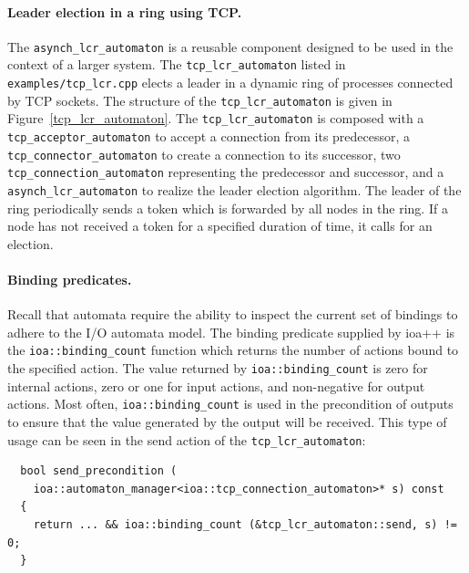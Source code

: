 \paragraph{Leader election in a ring using TCP.}
The \verb+asynch_lcr_automaton+ is a reusable component designed to be used in the context of a larger system.
The \verb+tcp_lcr_automaton+ listed in \verb+examples/tcp_lcr.cpp+ elects a leader in a dynamic ring of processes connected by TCP sockets.
The structure of the \verb+tcp_lcr_automaton+ is given in Figure~\ref{tcp_lcr_automaton}.
The \verb+tcp_lcr_automaton+ is composed with a \verb+tcp_acceptor_automaton+ to accept a connection from its predecessor, a \verb+tcp_connector_automaton+ to create a connection to its successor, two \verb+tcp_connection_automaton+ representing the predecessor and successor, and a \verb+asynch_lcr_automaton+ to realize the leader election algorithm.
The leader of the ring periodically sends a token which is forwarded by all nodes in the ring.
If a node has not received a token for a specified duration of time, it calls for an election.

\paragraph{Binding predicates.}
Recall that automata require the ability to inspect the current set of bindings to adhere to the I/O automata model.
The binding predicate supplied by ioa++ is the \verb+ioa::binding_count+ function which returns the number of actions bound to the specified action.
The value returned by \verb+ioa::binding_count+ is zero for internal actions, zero or one for input actions, and non-negative for output actions.
Most often, \verb+ioa::binding_count+ is used in the precondition of outputs to ensure that the value generated by the output will be received.
This type of usage can be seen in the send action of the \verb+tcp_lcr_automaton+:
\begin{lstlisting}
  bool send_precondition (
    ioa::automaton_manager<ioa::tcp_connection_automaton>* s) const
  {
    return ... && ioa::binding_count (&tcp_lcr_automaton::send, s) != 0;
  }
\end{lstlisting}

